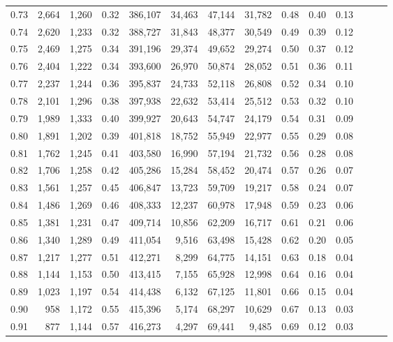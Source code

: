 \begin{tabular}{rrrrrrrrrrrrrr}
0.73 &  2,664 &  1,260 &  0.32 &  386,107 &   34,463 &  47,144 &  31,782 &  0.48 &  0.40 &      0.13 \\
0.74 &  2,620 &  1,233 &  0.32 &  388,727 &   31,843 &  48,377 &  30,549 &  0.49 &  0.39 &      0.12 \\
0.75 &  2,469 &  1,275 &  0.34 &  391,196 &   29,374 &  49,652 &  29,274 &  0.50 &  0.37 &      0.12 \\
0.76 &  2,404 &  1,222 &  0.34 &  393,600 &   26,970 &  50,874 &  28,052 &  0.51 &  0.36 &      0.11 \\
0.77 &  2,237 &  1,244 &  0.36 &  395,837 &   24,733 &  52,118 &  26,808 &  0.52 &  0.34 &      0.10 \\
0.78 &  2,101 &  1,296 &  0.38 &  397,938 &   22,632 &  53,414 &  25,512 &  0.53 &  0.32 &      0.10 \\
0.79 &  1,989 &  1,333 &  0.40 &  399,927 &   20,643 &  54,747 &  24,179 &  0.54 &  0.31 &      0.09 \\
0.80 &  1,891 &  1,202 &  0.39 &  401,818 &   18,752 &  55,949 &  22,977 &  0.55 &  0.29 &      0.08 \\
0.81 &  1,762 &  1,245 &  0.41 &  403,580 &   16,990 &  57,194 &  21,732 &  0.56 &  0.28 &      0.08 \\
0.82 &  1,706 &  1,258 &  0.42 &  405,286 &   15,284 &  58,452 &  20,474 &  0.57 &  0.26 &      0.07 \\
0.83 &  1,561 &  1,257 &  0.45 &  406,847 &   13,723 &  59,709 &  19,217 &  0.58 &  0.24 &      0.07 \\
0.84 &  1,486 &  1,269 &  0.46 &  408,333 &   12,237 &  60,978 &  17,948 &  0.59 &  0.23 &      0.06 \\
0.85 &  1,381 &  1,231 &  0.47 &  409,714 &   10,856 &  62,209 &  16,717 &  0.61 &  0.21 &      0.06 \\
0.86 &  1,340 &  1,289 &  0.49 &  411,054 &    9,516 &  63,498 &  15,428 &  0.62 &  0.20 &      0.05 \\
0.87 &  1,217 &  1,277 &  0.51 &  412,271 &    8,299 &  64,775 &  14,151 &  0.63 &  0.18 &      0.04 \\
0.88 &  1,144 &  1,153 &  0.50 &  413,415 &    7,155 &  65,928 &  12,998 &  0.64 &  0.16 &      0.04 \\
0.89 &  1,023 &  1,197 &  0.54 &  414,438 &    6,132 &  67,125 &  11,801 &  0.66 &  0.15 &      0.04 \\
0.90 &    958 &  1,172 &  0.55 &  415,396 &    5,174 &  68,297 &  10,629 &  0.67 &  0.13 &      0.03 \\
0.91 &    877 &  1,144 &  0.57 &  416,273 &    4,297 &  69,441 &   9,485 &  0.69 &  0.12 &      0.03 \\

\end{tabular}
